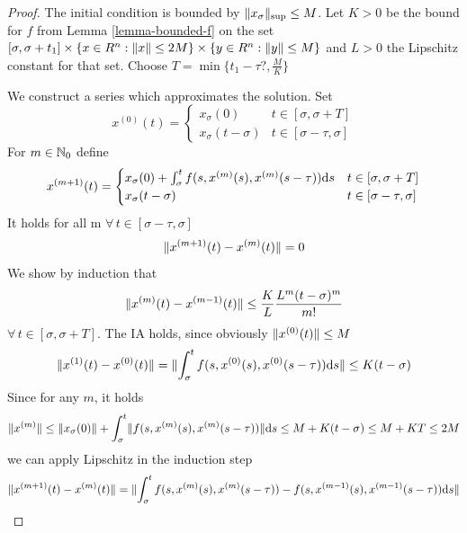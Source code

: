 \begin{proof}
    The initial condition is bounded by $\lVert x_\sigma\rVert_{\text{\scriptsize{sup}}}\leq M$.
    Let $K>0$ be the bound for $f$ from Lemma \ref{lemma-bounded-f} on the set $[\sigma,\sigma+t_1] \times \{x\in R^n: \lVert x\rVert\leq 2M\}\times \{y\in R^n: \lVert y\rVert\leq M\}$ and $L>0$ the Lipschitz constant for that set. Choose $T=\min\{t_1-\tau ?, \frac{M}{K}\}$

    We construct a series which approximates the solution.
    Set
    \begin{equation}
        x^{(0)}(t)= \begin{cases}
            x_\sigma(0) & t\in [\sigma,\sigma+T]\\
            x_\sigma(t-\sigma) & t\in [\sigma-\tau,\sigma]
        \end{cases}
    \end{equation}
    For $m\in\mathbb{N}_0$ define
    \begin{equation}
        x^{(m+1)}(t)= \begin{cases}
            x_\sigma(0) + \int_\sigma^t f(s,x^{(m)}(s),x^{(m)}(s-\tau))\text{d}s & t\in [\sigma,\sigma+T]\\
            x_\sigma(t-\sigma) & t\in [\sigma-\tau,\sigma]
        \end{cases}
    \end{equation}
    It holds for all m $\forall\,t\in [\sigma-\tau,\sigma]$
    \begin{equation}
        \lVert x^{(m+1)}(t)-x^{(m)}(t)\rVert=0
    \end{equation}
    We show by induction that
    \begin{equation}
        \lVert x^{(m)}(t)-x^{(m-1)}(t)\rVert \leq \frac{K}{L}\frac{L^m (t-\sigma)^m}{m!}
    \end{equation}
    $\forall\,t\in [\sigma,\sigma+T]$.
    The IA holds, since obviously $\lVert x^{(0)}(t)\rVert\leq M$
    \begin{equation}
        \lVert x^{(1)}(t)-x^{(0)}(t)\rVert = \lVert\int_\sigma^t f(s,x^{(0)}(s),x^{(0)}(s-\tau))\text{d}s\rVert \leq K(t-\sigma)
    \end{equation}
    Since for any $m$, it holds
    \begin{equation}
        \lVert x^{(m)}\rVert\leq \lVert x_\sigma(0)\rVert + \int_\sigma^t \lVert f(s,x^{(m)}(s),x^{(m)}(s-\tau))\rVert\text{d}s
        \leq M + K(t-\sigma) \leq M+KT \leq 2M
    \end{equation}
    we can apply Lipschitz in the induction step
    \begin{align}
        \norm{x^{(m+1)}(t)-x^{(m)}(t)} &= \norm{\int_\sigma^t f(s,x^{(m)}(s),x^{(m)}(s-\tau)) - f(s,x^{(m-1)}(s),x^{(m-1)}(s-\tau))\dx{s}}\\

\end{align}
\end{proof}
